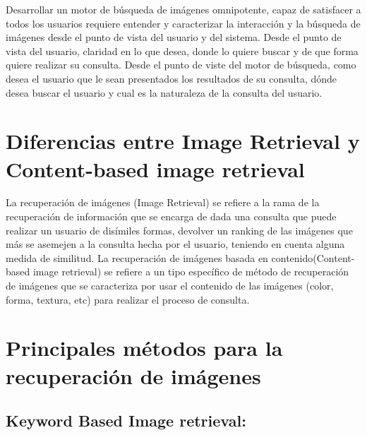 \documentclass{llncs}
\begin{document}
Desarrollar un motor de búsqueda de imágenes omnipotente, capaz de satisfacer a todos los usuarios 
requiere entender y caracterizar la interacción y la búsqueda de imágenes desde el punto de vista 
del usuario y del sistema. Desde el punto de vista del usuario, claridad en lo que desea, donde lo 
quiere buscar y de que forma quiere realizar su consulta. Desde el punto de viste del motor de 
búsqueda, como desea el usuario que le sean presentados los resultados de su consulta, dónde desea 
buscar el usuario y cual es la naturaleza de la consulta del usuario.


\chapter*{Diferencias entre Image Retrieval y Content-based image retrieval}



La recuperación de imágenes (Image Retrieval) se refiere a la rama de la recuperación de información que se encarga 
de dada una consulta que puede realizar un usuario de disímiles formas, devolver un ranking de las imágenes que más 
se asemejen a la consulta hecha por el usuario, teniendo en cuenta alguna medida de similitud. La recuperación de 
imágenes basada en contenido(Content-based image retrieval) se refiere a un tipo específico de método de recuperación de 
imágenes que se  caracteriza por usar el contenido de las imágenes (color, forma, textura, etc) para realizar el proceso 
de consulta.

\chapter*{Principales m\'etodos para la recuperaci\'on de im\'agenes}

\section{Keyword Based Image retrieval:}
\end{document}

